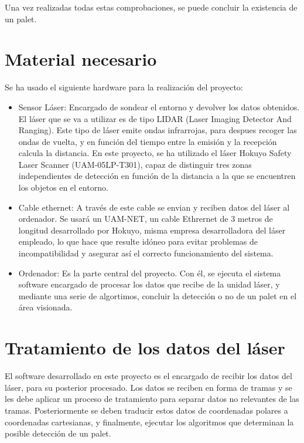 

Una vez realizadas todas estas comprobaciones, se puede concluir la existencia de un palet.


		









\section{Material necesario}

Se ha usado el siguiente hardware para la realización del proyecto:
\begin{itemize}
	\item Sensor Láser: Encargado de sondear el entorno y devolver los datos obtenidos. El láser que se va a utilizar es de tipo LIDAR (Laser Imaging Detector And Ranging).
Este tipo de láser emite ondas infrarrojas, para despues recoger las ondas de vuelta, y en función del tiempo entre la emisión y la recepción calcula la distancia.
En este proyecto, se ha utilizado el láser Hokuyo Safety Laser Scanner (UAM-05LP-T301), capaz de distinguir tres zonas independientes de detección en función de la distancia a la que se encuentren los objetos en el entorno.
	\item Cable ethernet: A través de este cable se envian y reciben datos del láser al ordenador. Se usará un UAM-NET, un cable Ethrernet de 3 metros de longitud desarrollado por Hokuyo, misma empresa desarrolladora del láser empleado, lo que hace que resulte idóneo para evitar problemas de incompatibilidad y asegurar así el correcto funcionamiento del sistema.
	\item Ordenador: Es la parte central del proyecto. Con él, se ejecuta el sistema software encargado de procesar los datos que recibe de la unidad láser, y mediante una serie de algortimos, concluir la detección o no de un palet en el área visionada.
\end{itemize}

\section{Tratamiento de los datos del láser}
El software desarrollado en este proyecto es el encargado de recibir los datos del láser, para su posterior procesado. Los datos se reciben en forma de tramas y se les debe aplicar un proceso de tratamiento para separar datos no relevantes de las tramas. Posteriormente se deben traducir estos datos de coordenadas polares a coordenadas cartesianas, y finalmente, ejecutar los algoritmos que determinan la posible detección de un palet.


